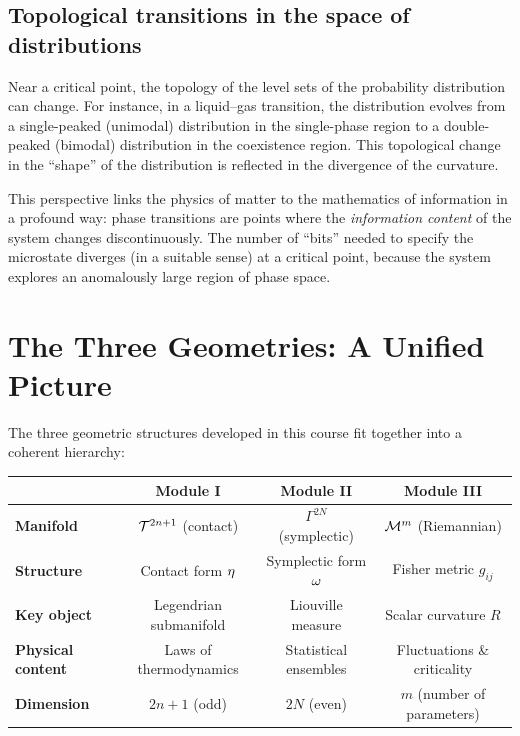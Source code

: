 \subsection{Topological transitions in the space of distributions}

Near a critical point, the topology of the level sets of the probability distribution can change. For instance, in a liquid--gas transition, the distribution evolves from a single-peaked (unimodal) distribution in the single-phase region to a double-peaked (bimodal) distribution in the coexistence region. This topological change in the ``shape'' of the distribution is reflected in the divergence of the curvature.

\begin{remark}
This perspective links the physics of matter to the mathematics of information in a profound way: phase transitions are points where the \emph{information content} of the system changes discontinuously. The number of ``bits'' needed to specify the microstate diverges (in a suitable sense) at a critical point, because the system explores an anomalously large region of phase space.
\end{remark}

\section{The Three Geometries: A Unified Picture}

The three geometric structures developed in this course fit together into a coherent hierarchy:

\begin{table}[H]
\centering
\renewcommand{\arraystretch}{1.8}
\begin{tabular}{lccc}
\toprule
& \textbf{Module I} & \textbf{Module II} & \textbf{Module III} \\
\midrule
\textbf{Manifold} & $\mathcal{T}^{2n+1}$ (contact) & $\Gamma^{2N}$ (symplectic) & $\mathcal{M}^m$ (Riemannian) \\
\textbf{Structure} & Contact form $\eta$ & Symplectic form $\omega$ & Fisher metric $g_{ij}$ \\
\textbf{Key object} & Legendrian submanifold & Liouville measure & Scalar curvature $R$ \\
\textbf{Physical content} & Laws of thermodynamics & Statistical ensembles & Fluctuations \& criticality \\
\textbf{Dimension} & $2n+1$ (odd) & $2N$ (even) & $m$ (number of parameters) \\
\bottomrule
\end{tabular}
\end{table}

